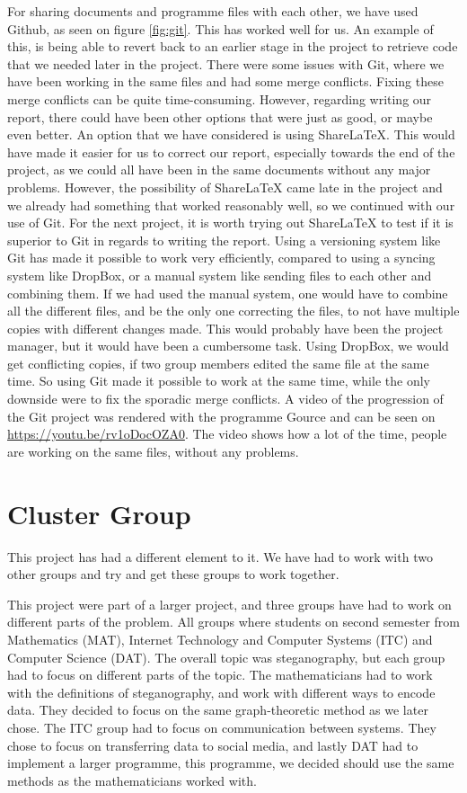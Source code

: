 For sharing documents and programme files with each other, we have used Github, as seen on figure \ref{fig:git}.
This has worked well for us. 
An example of this, is being able to revert back to an earlier stage in the project to retrieve code that we needed later in the project.
There were some issues with Git, where we have been working in the same files and had some merge conflicts.
Fixing these merge conflicts can be quite time-consuming.
However, regarding writing our report, there could have been other options that were just as good, or maybe even better.
An option that we have considered is using ShareLaTeX.
This would have made it easier for us to correct our report, especially towards the end of the project, as we could all have been in the same documents without any major problems.
However, the possibility of ShareLaTeX came late in the project and we already had something that worked reasonably well, so we continued with our use of Git. For the next project, it is worth trying out ShareLaTeX to test if it is superior to Git in regards to writing the report.
Using a versioning system like Git has made it possible to work very efficiently, compared to using a syncing system like DropBox, or a manual system like sending files to each other and combining them. If we had used the manual system, one would have to combine all the different files, and be the only one correcting the files, to not have multiple copies with different changes made. This would probably have been the project manager, but it would have been a cumbersome task. Using DropBox, we would get conflicting copies, if two group members edited the same file at the same time. So using Git made it possible to work at the same time, while the only downside were to fix the sporadic merge conflicts. 
A video of the progression of the Git project was rendered with the programme Gource and can be seen on \url{https://youtu.be/rv1oDocOZA0}. The video shows how a lot of the time, people are working on the same files, without any problems.  

\section{Cluster Group}
This project has had a different element to it.
We have had to work with two other groups and try and get these groups to work together. 

This project were part of a larger project, and three groups have had to work on different parts of the problem. All groups where students on second semester from Mathematics (MAT), Internet Technology and Computer Systems (ITC) and Computer Science (DAT). The overall topic was steganography, but each group had to focus on different parts of the topic. The mathematicians had to work with the definitions of steganography, and work with different ways to encode data. They decided to focus on the same graph-theoretic method as we later chose. The ITC group had to focus on communication between systems. They chose to focus on transferring data to social media, and lastly DAT had to implement a larger programme, this programme, we decided should use the same methods as the mathematicians worked with.

